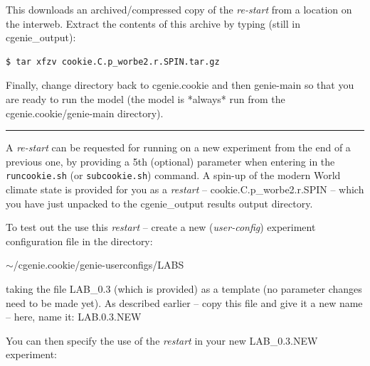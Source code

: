 This downloads an archived/compressed copy of the \textit{re-start} from a location on the interweb. Extract the contents of this archive by typing (still in \textsf{\footnotesize cgenie\_output}):

\vspace{-2mm}\small\begin{verbatim}
$ tar xfzv cookie.C.p_worbe2.r.SPIN.tar.gz
\end{verbatim}\normalsize\vspace{-2mm}

Finally, change directory back to \textsf{\footnotesize cgenie.cookie} and then \textsf{\footnotesize genie-main} so that you are ready to run the model (the model is *always* run from the \textsf{\footnotesize cgenie.cookie/genie-main} directory).

\vspace{1mm}\noindent\rule{4cm}{0.1mm}\vspace{2mm}

\newpage

\noindent A \textit{re-start} can be requested for running on a new experiment from the end of a previous one, by providing a 5th (optional) parameter when entering in the \texttt{runcookie.sh} (or \texttt{subcookie.sh}) command. A spin-up of the modern World climate state is provided for you as a \textit{restart} -- 
\textsf{\footnotesize cookie.C.p\_worbe2.r.SPIN} -- which you have just unpacked to the \textsf{\footnotesize cgenie\_output} results output directory.

To test out the use this \textit{restart} -- create a new (\textit{user-config}) experiment configuration file in the directory: 

\vspace{1mm}
\textsf{\footnotesize \(\sim\)/cgenie.cookie/genie-userconfigs/LABS}
\vspace{1mm}

\noindent taking the file \textsf{\footnotesize LAB\_0.3} (which is provided) as a template (no parameter changes need to be made yet). As described earlier -- copy this file and give it a new name -- here, name it: \textsf{\footnotesize LAB.0.3.NEW}

\noindent You can then specify the use of the \textit{restart} in your new \textsf{\footnotesize LAB\_0.3.NEW} experiment:

